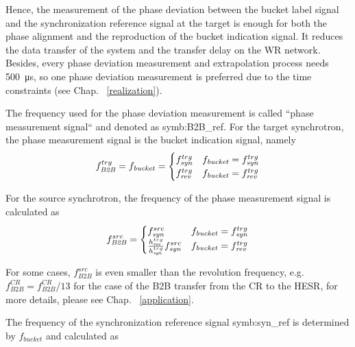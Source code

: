 Hence, the measurement of the phase deviation between the bucket label signal and the synchronization reference signal at the target is enough for both the phase alignment and the reproduction of the bucket indication signal. It reduces the data transfer of the system and the transfer delay on the WR network. Besides, every phase deviation measurement and extrapolation process needs \SI{500}{\us}, so one phase deviation measurement is preferred due to the time constraints (see Chap. ~\ref{realization}). 

The frequency used for the phase deviation measurement is called ``phase measurement signal`` and denoted as \gls{symb:B2B_ref}. For the target synchrotron, the phase measurement signal is the bucket indication signal, namely 
\begin{eqnarray}
f_{\mathit{B2B}}^{trg}=f_{\mathit{bucket}}=
\begin{cases}
f_{\mathit{syn}}^{trg} &f_{\mathit{bucket}}=f_{\mathit{syn}}^{trg}\cr

f_{\mathit{rev}}^{trg} &f_{\mathit{bucket}}=f_{\mathit{rev}}^{trg}
\end{cases}
\end{eqnarray} 

For the source synchrotron, the frequency of the phase measurement signal is calculated as
\begin{eqnarray}
f_{\mathit{B2B}}^{src}=
\begin{cases}
f_{\mathit{syn}}^{src} &f_{\mathit{bucket}}=f_{\mathit{syn}}^{trg}\cr

\frac{h_{\mathit{rev}}^{trg}}{h_{\mathit{syn}}^{trg}}f_{\mathit{syn}}^{src} &f_{\mathit{bucket}}=f_{\mathit{rev}}^{trg}
\end{cases}
\end{eqnarray}

For some cases, $f_{\mathit{B2B}}^{src}$ is even smaller than the revolution frequency, e.g. $f_{\mathit{B2B}}^{CR}=f_{\mathit{B2B}}^{CR}/13$ for the case of the B2B transfer from the CR to the HESR, for more details, please see Chap. ~\ref{application}.

The frequency of the synchronization reference signal \gls{symb:syn_ref} is determined by $f_{\mathit{bucket}}$ and calculated as

